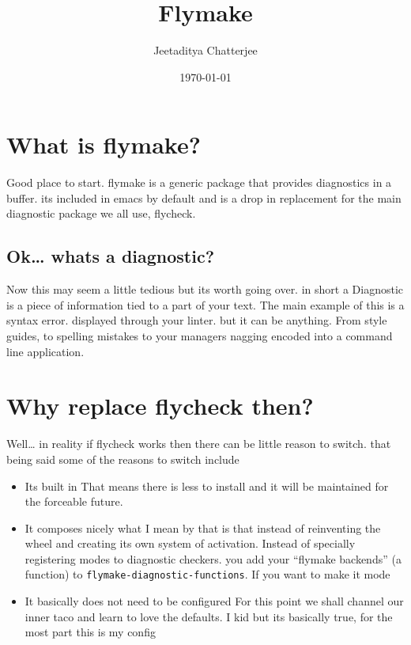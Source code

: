 \documentclass[a4paper]{article}
\author{Jeetaditya Chatterjee}
\date{\today}
\title{Flymake}
\begin{document}
\maketitle

\section*{What is flymake?}
\label{sec:org423a754}
\begin{notes}
Good place to start. flymake is a generic package that provides diagnostics in a
buffer. its included in emacs by default and is a drop in replacement for the
main diagnostic package we all use, flycheck.
\end{notes}
\subsection*{Ok\ldots{} whats a diagnostic?}
\label{sec:org86dea48}
\begin{notes}
Now this may seem a little tedious but its worth going over. in short a
Diagnostic is a piece of information tied to a part of your text. The main
example of this is a syntax error. displayed through your linter. but it can be
anything. From style guides, to spelling mistakes to your managers nagging
encoded into a command line application.
\end{notes}
\section*{Why replace flycheck then?}
\label{sec:orgc997eda}
\begin{notes}
Well\ldots{} in reality if flycheck works then there can be little reason to switch.
that being said some of the reasons to switch include
\begin{itemize}
\item Its built in
That means there is less to install and it will be maintained for the
forceable future.
\item It composes nicely
what I mean by that is that instead of reinventing the wheel and creating its
own system of activation. Instead of specially registering modes to diagnostic
checkers. you add your ``flymake backends'' (a function) to
\texttt{flymake-diagnostic-functions}. If you want to make it mode
\item It basically does not need to be configured
For this point we shall channel our inner taco and learn to love the defaults.
I kid but its basically true, for the most part this is my config
\end{itemize}
\end{notes}
\end{document}
